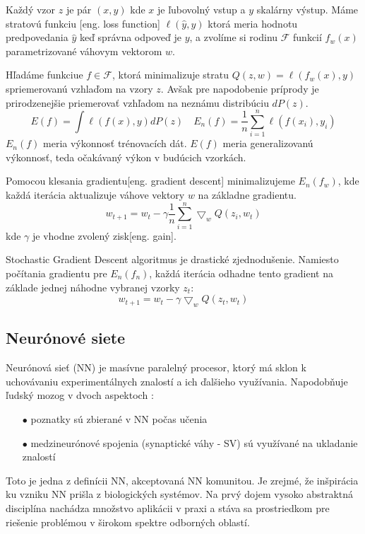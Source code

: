 Každý vzor $z$ je pár $(x, y)$ kde $x$ je ľubovolný vstup a $y$ skalárny výstup.
Máme stratovú funkciu [eng. loss function] $\ell(\hat{y},y)$ ktorá meria hodnotu predpovedania $\hat{y}$ keď správna odpoveď je $y$,
    a zvolíme si rodinu $\mathcal{F}$ funkcií $f_w(x)$ parametrizované váhovym vektorom $w$.

Hľadáme funkciue $f \in \mathcal{F}$, ktorá minimalizuje stratu $Q(z,w) = \ell(f_w(x), y)$ spriemerovanú vzhlaďom na vzory $z$.
Avšak pre napodobenie príprody je prirodzenejšie priemerovať vzhľadom na neznámu distribúciu $dP(z)$\cite{prop:StochasticGradientDescent}.
\begin{equation}
    E(f) = \int{\ell(f(x), y)dP(z)} \quad E_n(f) = \frac{1}{n}\sum_{i=1}^{n}\ell(f(x_i), y_i)
\end{equation}
$E_n(f)$ meria výkonnosť trénovacích dát. $E(f)$ meria generalizovanú výkonnosť, teda očakávaný výkon v budúcich vzorkách.

Pomocou klesania gradientu[eng. gradient descent] minimalizujeme $E_n(f_w)$, kde každá iterácia aktualizuje váhove vektory $w$ na základne gradientu.
\begin{equation}
    w_{t+1} = w_t - \gamma \frac{1}{n}\sum_{i=1}^{n}\bigtriangledown_w Q(z_i, w_t)
\end{equation}
kde $\gamma$ je vhodne zvolený zisk[eng. gain].

Stochastic Gradient Descent algoritmus je drastické zjednodušenie.
Namiesto počítania gradientu pre $E_n(f_n)$, každá iterácia odhadne tento gradient na základe jednej náhodne vybranej vzorky $z_t$\cite{prop:StochasticGradientDescent}:
\begin{equation}
    w_{t+1} = w_t - \gamma \bigtriangledown_w Q(z_t, w_t)
\end{equation}


\subsection{Neurónové siete}
Neurónová sieť (NN) je masívne paralelný procesor, ktorý má sklon k uchovávaniu experimentálnych znalostí a ich ďalšieho využívania.
Napodobňuje ľudský mozog v dvoch aspektoch \cite{odkaz:NNIntroduction}:
\begin{enumerate}
	\item[$\bullet$] poznatky sú zbierané v NN počas učenia
	\item[$\bullet$] medzineurónové spojenia (synaptické váhy - SV) sú využívané na ukladanie znalostí
\end{enumerate}
Toto je jedna z definícii NN, akceptovaná NN komunitou.
Je zrejmé, že inšpirácia ku vzniku NN prišla z biologických systémov.
Na prvý dojem vysoko abstraktná disciplína nachádza množstvo aplikácii v praxi a stáva sa prostriedkom pre riešenie problémou v širokom spektre odborných oblastí\cite{odkaz:NNIntroduction}.

